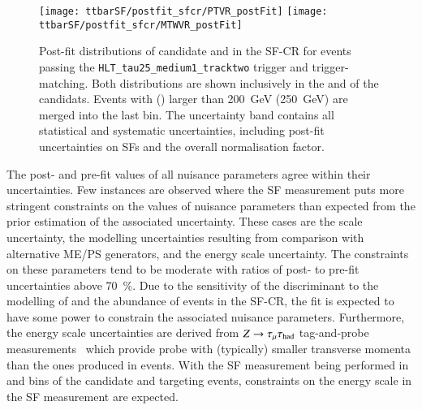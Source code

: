 \begin{figure}[htbp]
  \centering

  \texttt{[image: ttbarSF/postfit\_sfcr/PTVR\_postFit]}
  \texttt{[image: ttbarSF/postfit\_sfcr/MTWVR\_postFit]}

  \caption{Post-fit distributions of \tauhadvis candidate \pT and \mTW in the
    SF-CR for events passing the \texttt{HLT\_tau25\_medium1\_tracktwo} trigger
    and trigger-matching. Both distributions are shown inclusively in the
    \Ntracks and \pT of the \tauhadvis candidats. Events with \tauhadvis \pT
    (\mTW) larger than \SI{200}{\GeV} (\SI{250}{\GeV}) are merged into the last
    bin. The uncertainty band contains all statistical and systematic
    uncertainties, including post-fit uncertainties on \faketauhadvis SFs and
    the overall \ttbar normalisation factor.}%
  \label{fig:ttbarSF_postfit_ptmtw}
\end{figure}

The post- and pre-fit values of all nuisance parameters agree within their
uncertainties. Few instances are observed where the SF measurement puts more
stringent constraints on the values of nuisance parameters than expected from
the prior estimation of the associated uncertainty. These cases are the
\pTmissAbs scale uncertainty, the \ttbar modelling uncertainties resulting from
comparison with alternative ME/PS generators, and the \tauhadvis energy scale
uncertainty. The constraints on these parameters tend to be moderate with ratios
of post- to pre-fit uncertainties above \SI{70}{\percent}. Due to the
sensitivity of the \mTW discriminant to the modelling of \pTmissAbs and the
abundance of \ttbar events in the SF-CR, the fit is expected to have some power
to constrain the associated nuisance parameters. Furthermore, the \tauhadvis
energy scale uncertainties are derived from $Z \rightarrow \tau_{\mu} \tau_{\text{had}}$
tag-and-probe measurements~\cite{ATLAS-CONF-2017-029} which provide probe
\tauhadvis with (typically) smaller transverse momenta than the ones produced in
\ttbar events. With the SF measurement being performed in \Ntracks and \pT bins
of the \tauhadvis candidate and targeting \ttbar events, constraints on the
\tauhadvis energy scale in the SF measurement are expected.


